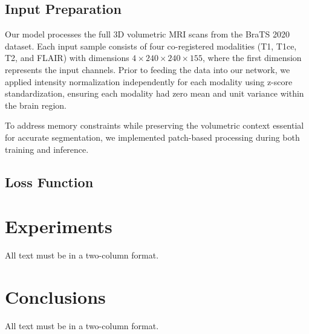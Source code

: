 \documentclass[10pt,twocolumn,letterpaper]{article}
\begin{document}
\subsection{Input Preparation}
Our model processes the full 3D volumetric MRI scans from the BraTS 2020 dataset. Each input sample consists of four co-registered modalities (T1, T1ce, T2, and FLAIR) with dimensions $4 \times 240 \times 240 \times 155$, where the first dimension represents the input channels. Prior to feeding the data into our network, we applied intensity normalization independently for each modality using z-score standardization, ensuring each modality had zero mean and unit variance within the brain region.

To address memory constraints while preserving the volumetric context essential for accurate segmentation, 
we implemented patch-based processing during both training and inference. 

\subsection{Loss Function}


\section{Experiments}

All text must be in a two-column format. 

\section{Conclusions}

All text must be in a two-column format. 


{\small


}
\end{document}
